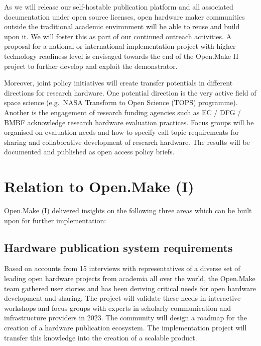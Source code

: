 \documentclass[
  12pt,
  a4paper,
]{article}
\begin{document}
As we will release our self-hostable publication platform and all
associated documentation under open source licenses, open hardware maker
communities outside the traditional academic environment will be able to
reuse and build upon it. We will foster this as part of our continued
outreach activities. A proposal for a national or international
implementation project with higher technology readiness level is
envisaged towards the end of the Open.Make II project to further develop
and exploit the demonstrator.

Moreover, joint policy initiatives will create transfer potentials in
different directions for research hardware. One potential direction is
the very active field of space science (e.g.~NASA Transform to Open
Science (TOPS) programme). Another is the engagement of research funding
agencies such as EC / DFG / BMBF acknowledge research hardware
evaluation practices. Focus groups will be organised on evaluation needs
and how to specify call topic requirements for sharing and collaborative
development of research hardware. The results will be documented and
published as open access policy briefs.

\hypertarget{relation-to-open.make-i}{%
\section{Relation to Open.Make (I)}\label{relation-to-open.make-i}}

Open.Make (I) delivered insights on the following three areas which can
be built upon for further implementation:

\hypertarget{hardware-publication-system-requirements}{%
\subsection{Hardware publication system
requirements}\label{hardware-publication-system-requirements}}

Based on accounts from 15 interviews with representatives of a diverse
set of leading open hardware projects from academia all over the world,
the Open.Make team gathered user stories and has been deriving critical
needs for open hardware development and sharing. The project will
validate these needs in interactive workshops and focus groups with
experts in scholarly communication and infrastructure providers in 2023.
The community will design a roadmap for the creation of a hardware
publication ecosystem. The implementation project will transfer this
knowledge into the creation of a scalable product.
\end{document}

